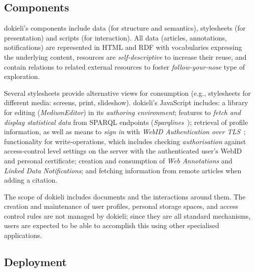 \documentclass[a4paper]{llncs}
\begin{document}
                            
                                \subsection{Components}
  \label{components}

                                
                                    
\par dokieli’s components include data (for structure and semantics), stylesheets (for presentation) and scripts (for interaction). All data (articles, annotations, notifications) are represented in HTML and RDF with vocabularies expressing the underlying content, resources are \textit{self-descriptive} to increase their reuse, and contain relations to related external resources to foster \textit{follow-your-nose} type of exploration.

                                    
\par Several stylesheets provide alternative views for consumption (e.g., stylesheets for different media: screens, print, slideshow). dokieli’s JavaScript includes: a library for editing (\textit{MediumEditor}) in its \textit{authoring environment}; features to \textit{fetch and display statistical data} from SPARQL endpoints (\textit{Sparqlines}~\cite{ref-12}); retrieval of profile information, as well as means to \textit{sign in} with \textit{WebID Authentication over TLS}~\cite{ref-13}; functionality for write-operations, which includes checking \textit{authorisation} against access-control level settings on the server with the authenticated user’s WebID and personal certificate; creation and consumption of \textit{Web Annotations} and \textit{Linked Data Notifications}; and fetching information from remote articles when adding a citation.

                                    
\par The scope of dokieli includes documents and the interactions around them. The creation and maintenance of user profiles, personal storage spaces, and access control rules are not managed by dokieli; since they are all standard mechanisms, users are expected to be able to accomplish this using other specialised applications.
                                
                            

                            
                                \subsection{Deployment}
  \label{deployment}
\end{document}
